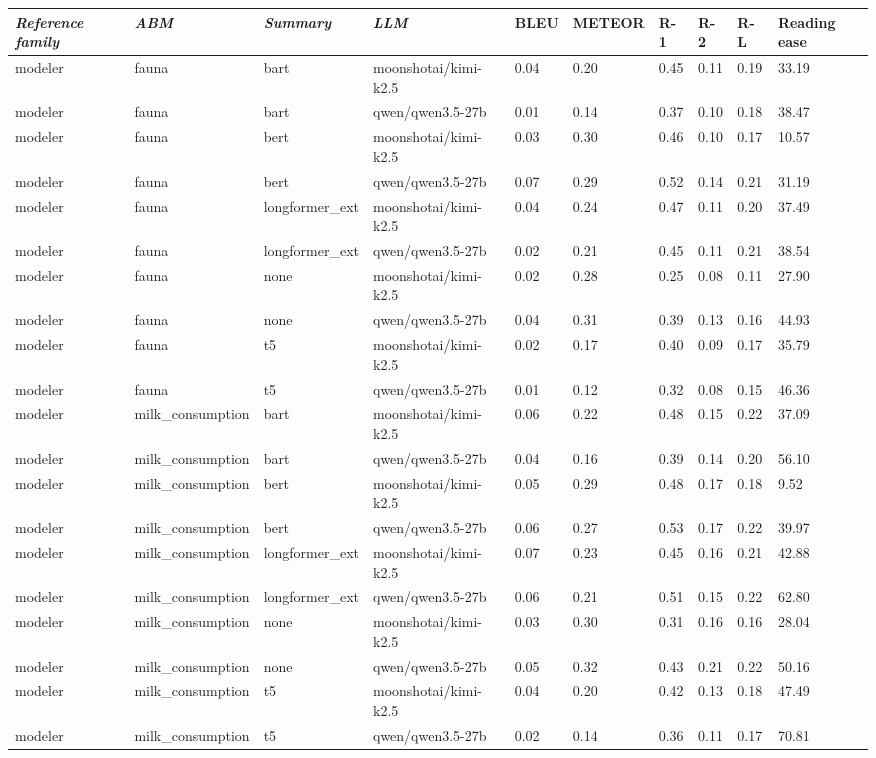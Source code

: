\begin{tabular}{|l|l|l|l|l|l|l|l|l|l|}
\hline
\textit{\textbf{Reference family}} & \textit{\textbf{ABM}} & \textit{\textbf{Summary}} & \textit{\textbf{LLM}} & BLEU & METEOR & R-1 & R-2 & R-L & Reading ease \\
 \hline
 modeler & fauna & bart & moonshotai/kimi-k2.5 & 0.04 & 0.20 & 0.45 & 0.11 & 0.19 & 33.19 \\
 \hline
 modeler & fauna & bart & qwen/qwen3.5-27b & 0.01 & 0.14 & 0.37 & 0.10 & 0.18 & 38.47 \\
 \hline
 modeler & fauna & bert & moonshotai/kimi-k2.5 & 0.03 & 0.30 & 0.46 & 0.10 & 0.17 & 10.57 \\
 \hline
 modeler & fauna & bert & qwen/qwen3.5-27b & 0.07 & 0.29 & 0.52 & 0.14 & 0.21 & 31.19 \\
 \hline
 modeler & fauna & longformer\_ext & moonshotai/kimi-k2.5 & 0.04 & 0.24 & 0.47 & 0.11 & 0.20 & 37.49 \\
 \hline
 modeler & fauna & longformer\_ext & qwen/qwen3.5-27b & 0.02 & 0.21 & 0.45 & 0.11 & 0.21 & 38.54 \\
 \hline
 modeler & fauna & none & moonshotai/kimi-k2.5 & 0.02 & 0.28 & 0.25 & 0.08 & 0.11 & 27.90 \\
 \hline
 modeler & fauna & none & qwen/qwen3.5-27b & 0.04 & 0.31 & 0.39 & 0.13 & 0.16 & 44.93 \\
 \hline
 modeler & fauna & t5 & moonshotai/kimi-k2.5 & 0.02 & 0.17 & 0.40 & 0.09 & 0.17 & 35.79 \\
 \hline
 modeler & fauna & t5 & qwen/qwen3.5-27b & 0.01 & 0.12 & 0.32 & 0.08 & 0.15 & 46.36 \\
 \hline
 modeler & milk\_consumption & bart & moonshotai/kimi-k2.5 & 0.06 & 0.22 & 0.48 & 0.15 & 0.22 & 37.09 \\
 \hline
 modeler & milk\_consumption & bart & qwen/qwen3.5-27b & 0.04 & 0.16 & 0.39 & 0.14 & 0.20 & 56.10 \\
 \hline
 modeler & milk\_consumption & bert & moonshotai/kimi-k2.5 & 0.05 & 0.29 & 0.48 & 0.17 & 0.18 & 9.52 \\
 \hline
 modeler & milk\_consumption & bert & qwen/qwen3.5-27b & 0.06 & 0.27 & 0.53 & 0.17 & 0.22 & 39.97 \\
 \hline
 modeler & milk\_consumption & longformer\_ext & moonshotai/kimi-k2.5 & 0.07 & 0.23 & 0.45 & 0.16 & 0.21 & 42.88 \\
 \hline
 modeler & milk\_consumption & longformer\_ext & qwen/qwen3.5-27b & 0.06 & 0.21 & 0.51 & 0.15 & 0.22 & 62.80 \\
 \hline
 modeler & milk\_consumption & none & moonshotai/kimi-k2.5 & 0.03 & 0.30 & 0.31 & 0.16 & 0.16 & 28.04 \\
 \hline
 modeler & milk\_consumption & none & qwen/qwen3.5-27b & 0.05 & 0.32 & 0.43 & 0.21 & 0.22 & 50.16 \\
 \hline
 modeler & milk\_consumption & t5 & moonshotai/kimi-k2.5 & 0.04 & 0.20 & 0.42 & 0.13 & 0.18 & 47.49 \\
 \hline
 modeler & milk\_consumption & t5 & qwen/qwen3.5-27b & 0.02 & 0.14 & 0.36 & 0.11 & 0.17 & 70.81 \\
\hline
\end{tabular}
